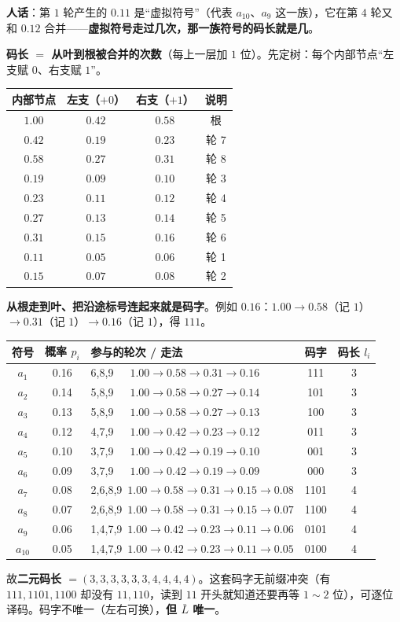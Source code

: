 \documentclass[11pt,a4paper]{ctexart}
\begin{document}
\textbf{人话}：第 $1$ 轮产生的 $0.11$ 是“虚拟符号”（代表 $a_{10}$、$a_9$ 这一族），它在第 $4$ 轮又和 $0.12$ 合并——\textbf{虚拟符号走过几次，那一族符号的码长就是几}。

\textbf{码长 $=$ 从叶到根被合并的次数}（每上一层加 $1$ 位）。先定树：每个内部节点“左支赋 $0$、右支赋 $1$”。

\begin{center}
\small
\begin{tabular}{@{}c c c c@{}}
\toprule
内部节点 & 左支（$+0$） & 右支（$+1$） & 说明\\
\midrule
$1.00$ & $0.42$ & $0.58$ & 根\\
$0.42$ & $0.19$ & $0.23$ & 轮 7\\
$0.58$ & $0.27$ & $0.31$ & 轮 8\\
$0.19$ & $0.09$ & $0.10$ & 轮 3\\
$0.23$ & $0.11$ & $0.12$ & 轮 4\\
$0.27$ & $0.13$ & $0.14$ & 轮 5\\
$0.31$ & $0.15$ & $0.16$ & 轮 6\\
$0.11$ & $0.05$ & $0.06$ & 轮 1\\
$0.15$ & $0.07$ & $0.08$ & 轮 2\\
\bottomrule
\end{tabular}
\end{center}

\textbf{从根走到叶、把沿途标号连起来就是码字}。例如 $0.16$：$1.00\to0.58$（记 $1$）$\to0.31$（记 $1$）$\to0.16$（记 $1$），得 $111$。

\begin{center}
\small
\begin{tabular}{@{}c c l c c@{}}
\toprule
符号 & 概率 $p_i$ & 参与的轮次 / 走法 & 码字 & 码长 $l_i$\\
\midrule
$a_1$ & 0.16 & 6,8,9\ \ \ $1.00\to0.58\to0.31\to0.16$ & 111 & 3\\
$a_2$ & 0.14 & 5,8,9\ \ \ $1.00\to0.58\to0.27\to0.14$ & 101 & 3\\
$a_3$ & 0.13 & 5,8,9\ \ \ $1.00\to0.58\to0.27\to0.13$ & 100 & 3\\
$a_4$ & 0.12 & 4,7,9\ \ \ $1.00\to0.42\to0.23\to0.12$ & 011 & 3\\
$a_5$ & 0.10 & 3,7,9\ \ \ $1.00\to0.42\to0.19\to0.10$ & 001 & 3\\
$a_6$ & 0.09 & 3,7,9\ \ \ $1.00\to0.42\to0.19\to0.09$ & 000 & 3\\
$a_7$ & 0.08 & 2,6,8,9\ $1.00\to0.58\to0.31\to0.15\to0.08$ & 1101 & 4\\
$a_8$ & 0.07 & 2,6,8,9\ $1.00\to0.58\to0.31\to0.15\to0.07$ & 1100 & 4\\
$a_9$ & 0.06 & 1,4,7,9\ $1.00\to0.42\to0.23\to0.11\to0.06$ & 0101 & 4\\
$a_{10}$ & 0.05 & 1,4,7,9\ $1.00\to0.42\to0.23\to0.11\to0.05$ & 0100 & 4\\
\bottomrule
\end{tabular}
\end{center}
故\textbf{二元码长 $=(3,3,3,3,3,3,4,4,4,4)$}。这套码字无前缀冲突（有 $111,1101,1100$ 却没有 $11,110$，读到 $11$ 开头就知道还要再等 $1\sim2$ 位），可逐位译码。码字不唯一（左右可换），\textbf{但 $\bar L$ 唯一}。
\end{document}

